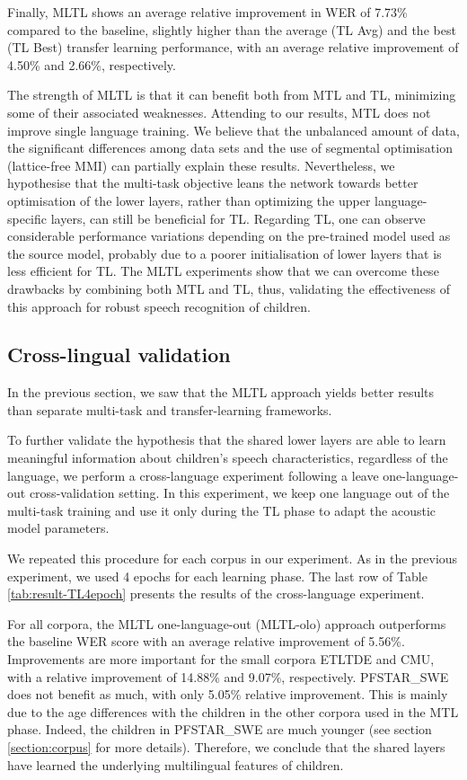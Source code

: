Finally, MLTL shows an average relative improvement in WER of 7.73\%  compared to the baseline, slightly higher than the average (TL Avg) and the best (TL Best) transfer learning performance, with an average relative improvement of 4.50\% and 2.66\%, respectively. 

The strength of MLTL is that it can benefit both from MTL and TL, minimizing some of their associated weaknesses.
Attending to our results, MTL does not improve single language training. We believe that the unbalanced amount of data, the significant differences among data sets and the use of segmental optimisation (lattice-free MMI) can partially explain these results. Nevertheless, we hypothesise that the multi-task objective leans the network towards 
better optimisation of the lower layers, rather than optimizing the upper language-specific layers, can still be beneficial for TL.
Regarding TL, one can observe considerable performance variations depending on the pre-trained model used as the source model, probably due to a poorer initialisation of lower layers that is less efficient for TL. The MLTL experiments show that we can overcome these drawbacks by combining both MTL and TL, thus, validating the effectiveness of this approach for robust speech recognition of children.



\subsection{Cross-lingual validation}
\label{section:olo}

In the previous section, we saw that the MLTL approach yields better results than separate multi-task and transfer-learning frameworks.

To further validate the hypothesis that the shared lower layers are able to learn meaningful information about children's speech characteristics, regardless of the language, we perform a cross-language experiment following a leave one-language-out cross-validation setting. In this experiment, we keep one language out of the multi-task training and use it only during the TL phase to adapt the acoustic model parameters. 

We repeated this procedure for each corpus in our experiment. As in the previous experiment, we used 4 epochs for each learning phase. The last row of Table \ref{tab:result-TL4epoch} presents the results of the cross-language experiment.

For all corpora, the MLTL one-language-out (MLTL-olo) approach outperforms the baseline WER score with an average relative improvement of 5.56\%. Improvements are more important for the small corpora ETLTDE and CMU, with a  relative improvement of 14.88\% and 9.07\%, respectively. PFSTAR\_SWE does not benefit as much, with only 5.05\% relative improvement. This is mainly due to the age differences with the children in the other corpora used in the MTL phase. Indeed, the children in PFSTAR\_SWE are much younger (see section  \ref{section:corpus} for more details). Therefore, we conclude that the shared layers have learned the underlying multilingual features of children.

